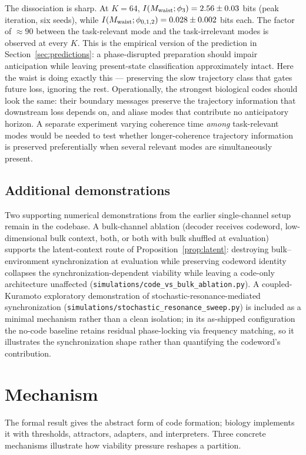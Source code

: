 \documentclass[12pt]{article}
\theoremstyle{definition}
\begin{document}
The dissociation is sharp. At $K=64$, $I(M_{\rm waist};\phi_3)=2.56\pm 0.03$ bits (peak iteration, six seeds), while $I(M_{\rm waist};\phi_{0,1,2})=0.028\pm 0.002$ bits each. The factor of $\approx\!90$ between the task-relevant mode and the task-irrelevant modes is observed at every $K$. This is the empirical version of the prediction in Section~\ref{sec:predictions}: a phase-disrupted preparation should impair anticipation while leaving present-state classification approximately intact. Here the waist is doing exactly this --- preserving the slow trajectory class that gates future loss, ignoring the rest. Operationally, the strongest biological codes should look the same: their boundary messages preserve the trajectory information that downstream loss depends on, and aliase modes that contribute no anticipatory horizon. A separate experiment varying coherence time \emph{among} task-relevant modes would be needed to test whether longer-coherence trajectory information is preserved preferentially when several relevant modes are simultaneously present.

\subsection{Additional demonstrations}

Two supporting numerical demonstrations from the earlier single-channel setup remain in the codebase. A bulk-channel ablation (decoder receives codeword, low-dimensional bulk context, both, or both with bulk shuffled at evaluation) supports the latent-context route of Proposition~\ref{prop:latent}: destroying bulk--environment synchronization at evaluation while preserving codeword identity collapses the synchronization-dependent viability while leaving a code-only architecture unaffected (\texttt{simulations/code\_vs\_bulk\_ablation.py}). A coupled-Kuramoto exploratory demonstration of stochastic-resonance-mediated synchronization (\texttt{simulations/stochastic\_resonance\_sweep.py}) is included as a minimal mechanism rather than a clean isolation; in its as-shipped configuration the no-code baseline retains residual phase-locking via frequency matching, so it illustrates the synchronization shape rather than quantifying the codeword's contribution.

\section{Mechanism}
\label{sec:mechanism}

The formal result gives the abstract form of code formation; biology implements it with thresholds, attractors, adapters, and interpreters. Three concrete mechanisms illustrate how viability pressure reshapes a partition.
\end{document}
